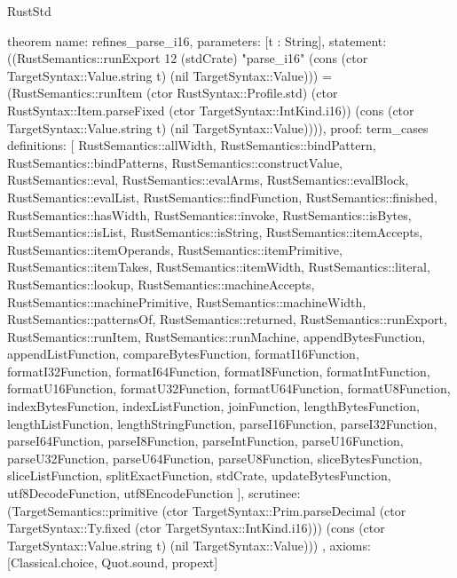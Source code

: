 \begin{lexlean}{RustStd}
\begin{semanticmodule}
theorem{
  name: refines_parse_i16,
  parameters: [t : String],
  statement: ((RustSemantics::runExport 12 (stdCrate) "parse_i16" (cons (ctor TargetSyntax::Value.string t) (nil TargetSyntax::Value))) = (RustSemantics::runItem (ctor RustSyntax::Profile.std) (ctor RustSyntax::Item.parseFixed (ctor TargetSyntax::IntKind.i16)) (cons (ctor TargetSyntax::Value.string t) (nil TargetSyntax::Value)))),
  proof: term_cases{
    definitions: [
      RustSemantics::allWidth,
      RustSemantics::bindPattern,
      RustSemantics::bindPatterns,
      RustSemantics::constructValue,
      RustSemantics::eval,
      RustSemantics::evalArms,
      RustSemantics::evalBlock,
      RustSemantics::evalList,
      RustSemantics::findFunction,
      RustSemantics::finished,
      RustSemantics::hasWidth,
      RustSemantics::invoke,
      RustSemantics::isBytes,
      RustSemantics::isList,
      RustSemantics::isString,
      RustSemantics::itemAccepts,
      RustSemantics::itemOperands,
      RustSemantics::itemPrimitive,
      RustSemantics::itemTakes,
      RustSemantics::itemWidth,
      RustSemantics::literal,
      RustSemantics::lookup,
      RustSemantics::machineAccepts,
      RustSemantics::machinePrimitive,
      RustSemantics::machineWidth,
      RustSemantics::patternsOf,
      RustSemantics::returned,
      RustSemantics::runExport,
      RustSemantics::runItem,
      RustSemantics::runMachine,
      appendBytesFunction,
      appendListFunction,
      compareBytesFunction,
      formatI16Function,
      formatI32Function,
      formatI64Function,
      formatI8Function,
      formatIntFunction,
      formatU16Function,
      formatU32Function,
      formatU64Function,
      formatU8Function,
      indexBytesFunction,
      indexListFunction,
      joinFunction,
      lengthBytesFunction,
      lengthListFunction,
      lengthStringFunction,
      parseI16Function,
      parseI32Function,
      parseI64Function,
      parseI8Function,
      parseIntFunction,
      parseU16Function,
      parseU32Function,
      parseU64Function,
      parseU8Function,
      sliceBytesFunction,
      sliceListFunction,
      splitExactFunction,
      stdCrate,
      updateBytesFunction,
      utf8DecodeFunction,
      utf8EncodeFunction
    ],
    scrutinee: (TargetSemantics::primitive (ctor TargetSyntax::Prim.parseDecimal (ctor TargetSyntax::Ty.fixed (ctor TargetSyntax::IntKind.i16))) (cons (ctor TargetSyntax::Value.string t) (nil TargetSyntax::Value)))
  },
  axioms: [Classical.choice, Quot.sound, propext]
}


\end{semanticmodule}
\end{lexlean}

